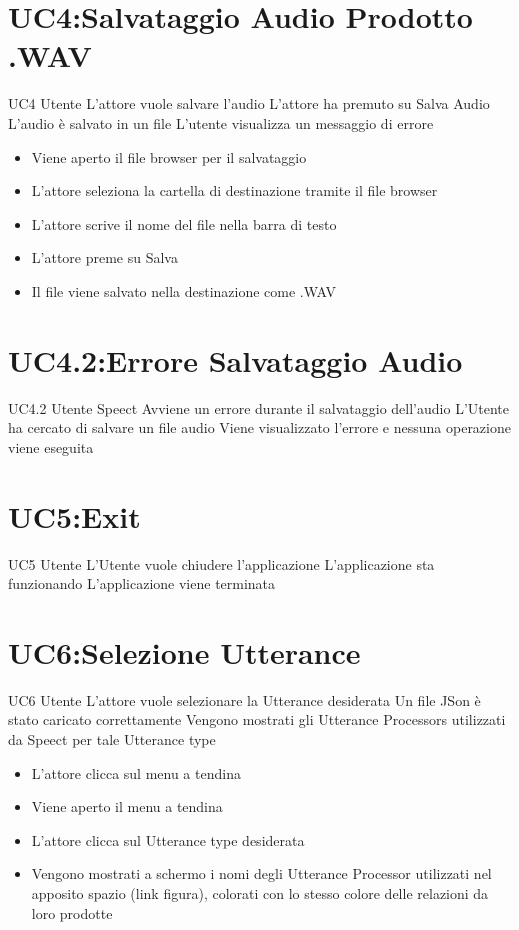\documentclass[../AnalisideiRequisiti.tex]{subfiles}
\begin{document}
\section{UC4:Salvataggio Audio Prodotto .WAV}
\UserCase
{UC4}
{Utente}
{}
{L'attore vuole salvare l'audio}
{L'attore ha premuto su Salva Audio}
{L'audio è salvato in un file}
{L'utente visualizza un messaggio di errore }
{
		\begin{itemize}
		\item{} Viene aperto il file browser per il salvataggio
		\item{} L'attore seleziona la cartella di destinazione tramite il file browser 
		\item{} L'attore scrive il nome del file nella barra di testo
		\item{} L'attore preme su Salva 
		\item{} Il file viene salvato nella destinazione come .WAV
\end{itemize}
}	
\section{UC4.2:Errore Salvataggio Audio}
\UserCase
{UC4.2}
{Utente}
{Speect}
{Avviene un errore durante il salvataggio dell'audio}
{L'Utente ha cercato di salvare un file audio}
{Viene visualizzato l'errore e nessuna operazione viene eseguita}
{}
{}

\section{UC5:Exit}
\UserCase
{UC5}
{Utente}
{}
{L'Utente vuole chiudere l'applicazione }
{L'applicazione sta funzionando}
{L'applicazione viene terminata}
{}
{
}

\section{UC6:Selezione Utterance}
\UserCase
{UC6}
{Utente}
{}
{L'attore vuole selezionare la Utterance desiderata }
{Un file JSon è stato caricato  correttamente }
{Vengono mostrati gli Utterance Processors utilizzati da Speect per tale Utterance type}
{}
{
	\begin{itemize}
		\item{} L'attore clicca sul menu a tendina
		\item{} Viene aperto il menu a tendina
		\item{} L'attore clicca sul Utterance type desiderata
		\item{} Vengono mostrati a schermo i nomi degli Utterance Processor utilizzati nel apposito spazio (link figura), colorati con lo stesso colore delle relazioni da loro prodotte
		
	\end{itemize}
}
\end{document}
